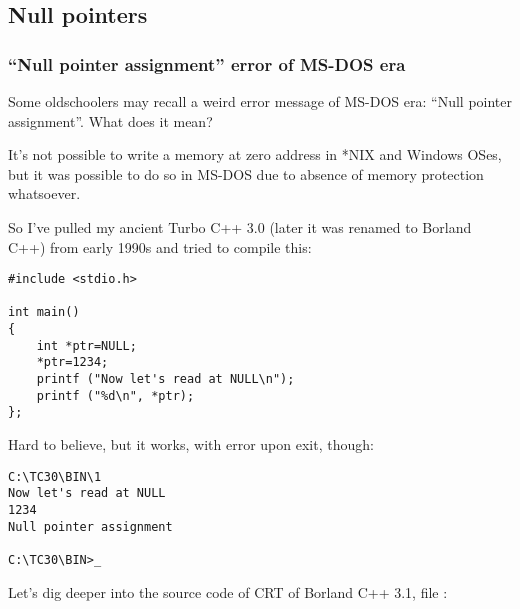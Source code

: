 \subsection{Null pointers}

\subsubsection{``Null pointer assignment'' error of MS-DOS era}

Some oldschoolers may recall a weird error message of MS-DOS era: ``Null pointer assignment''.
What does it mean?

It's not possible to write a memory at zero address in *NIX and Windows OSes, but it was possible to do so in MS-DOS due to absence of memory protection whatsoever.

So I've pulled my ancient Turbo C++ 3.0 (later it was renamed to Borland C++) from early 1990s and tried to compile this:

\begin{lstlisting}[style=customc]
#include <stdio.h>

int main()
{
	int *ptr=NULL;
	*ptr=1234;
	printf ("Now let's read at NULL\n");
	printf ("%d\n", *ptr);
};
\end{lstlisting}

Hard to believe, but it works, with error upon exit, though:

\begin{lstlisting}[caption=Ancient Turbo C 3.0]
C:\TC30\BIN\1
Now let's read at NULL
1234
Null pointer assignment

C:\TC30\BIN>_
\end{lstlisting}

Let's dig deeper into the source code of \ac{CRT} of Borland C++ 3.1, file :

